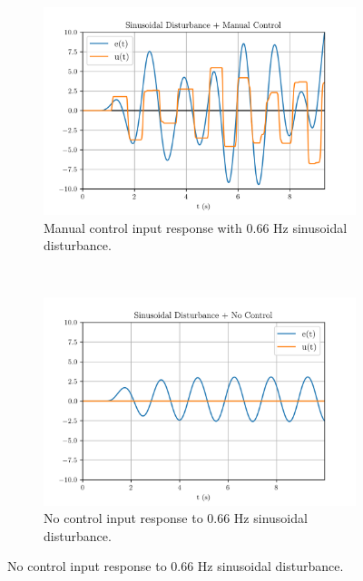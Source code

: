 \documentclass[8pt]{article}
\begin{document}
\begin{figure}[H]
    \centering
    \begin{subfigure}[t]{0.48\textwidth}
        \centering
        \includegraphics[width=1\textwidth]{figures/FIGURE_7.png}
        \caption{Manual control input response with $0.66$ Hz sinusoidal disturbance.}
        \label{fig:figure7}
    \end{subfigure}
    ~
    \begin{subfigure}[t]{0.48\textwidth}
        \centering
        \includegraphics[width=1\textwidth]{figures/FIGURE_8.png}
        \caption{No control input response to $0.66$ Hz sinusoidal disturbance.}
        \label{fig:figure8}
    \end{subfigure}


\end{figure}
\end{document}
